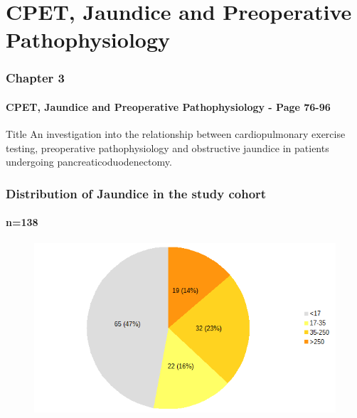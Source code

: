 \documentclass[10pt]{beamer}
\begin{document}
\section[Chapter 3]{CPET, Jaundice and Preoperative Pathophysiology}

\begin{frame}
	\frametitle{Chapter 3}
	\framesubtitle{CPET, Jaundice and Preoperative Pathophysiology - Page 76-96 }
	\begin{block}{Title}
	An investigation into the relationship between cardiopulmonary exercise testing, preoperative pathophysiology and obstructive jaundice in patients undergoing pancreaticoduodenectomy.
	\end{block}
\end{frame}

\begin{frame}
	\frametitle{Distribution of Jaundice in the study cohort }
	\framesubtitle{n=138}

	\begin{figure}
		\centering
		\includegraphics[width=0.7\linewidth]{jaundice_distribution}
		\caption{}
		\label{fig:jaundice_distribution}
	\end{figure}
\end{frame}
\end{document}
